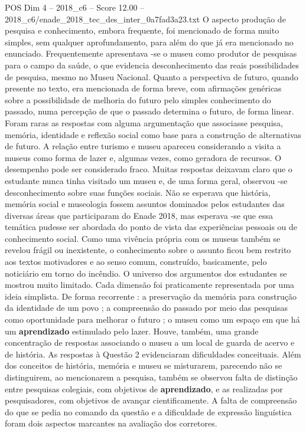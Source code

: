 \begin{textsample}{POS Dim 4 – 2018\_c6 – Score 12.00 – 2018\_c6/enade\_2018\_tec\_des\_inter\_0a7fad3a23.txt}
O aspecto produção de pesquisa e conhecimento, embora frequente, foi mencionado de forma muito simples, sem qualquer aprofundamento, para além do que já era mencionado no enunciado.
Frequentemente apresentava -se o museu como produtor de pesquisas para o campo da saúde, o que evidencia desconhecimento das reais possibilidades de pesquisa, mesmo no Museu Nacional.
Quanto a perspectiva de futuro, quando presente no texto, era mencionada de forma breve, com afirmações genéricas sobre a possibilidade de melhoria do futuro pelo simples conhecimento do passado, numa percepção de que o passado determina o futuro, de forma linear.
Foram raras as respostas com alguma argumentação que associasse pesquisa, memória, identidade e reflexão social como base para a construção de alternativas de futuro.
A relação entre turismo e museu apareceu considerando a visita a museus como forma de lazer e, algumas vezes, como geradora de recursos.
O desempenho pode ser considerado fraco.
Muitas respostas deixavam claro que o estudante nunca tinha visitado um museu e, de uma forma geral, observou -se desconhecimento sobre suas funções sociais.
Não se esperava que história, memória social e museologia fossem assuntos dominados pelos estudantes das diversas áreas que participaram do Enade 2018, mas esperava -se que essa temática pudesse ser abordada do ponto de vista das experiências pessoais ou de conhecimento social.
Como uma vivência própria com os museus também se revelou frágil ou inexistente, o conhecimento sobre o assunto ficou bem restrito aos textos motivadores e ao senso comum, construído, basicamente, pelo noticiário em torno do incêndio.
O universo dos argumentos dos estudantes se mostrou muito limitado.
Cada dimensão foi praticamente representada por uma ideia simplista.
De forma recorrente : a preservação da memória para construção da identidade de um povo ; a compreensão do passado por meio das pesquisas como oportunidade para melhorar o futuro ; o museu como um espaço em que há um \textbf{aprendizado} estimulado pelo lazer.
Houve, também, uma grande concentração de respostas associando o museu a um local de guarda de acervo e de história.
As respostas à Questão 2 evidenciaram dificuldades conceituais.
Além dos conceitos de história, memória e museu se misturarem, parecendo não se distinguirem, ao mencionarem a pesquisa, também se observou falta de distinção entre pesquisas colegiais, com objetivos de \textbf{aprendizado}, e as realizadas por pesquisadores, com objetivos de avançar cientificamente.
A falta de compreensão do que se pedia no comando da questão e a dificuldade de expressão linguística foram dois aspectos marcantes na avaliação dos corretores.

\end{textsample}
